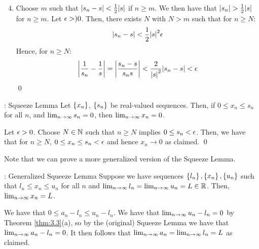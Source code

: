 \begin{nproofcont}
    \begin{enumerate}
        \setcounter{enumi}{3}
        \item Choose $m$ such that $\abs{s_n - s} < \frac{1}{2}\abs{s}$ if $n \geq m$. We then have that $\abs{s_n} > \frac{1}{2}\abs{s}$ for $n \geq m$. Let $\epsilon > )0$. Then, there exists $N$ with $N > m$ such that for $n \geq N$:
        \begin{align*}
            \abs{s_n - s} < \frac{1}{2}\abs{s}^2\epsilon
        \end{align*}
        Hence, for $n \geq N$:
        \begin{align*}
            \abs{\frac{1}{s_n} - \frac{1}{s}} = \abs{\frac{s_n - s}{s_ns}} < \frac{2}{\abs{s}^2}\abs{s_n - s} < \epsilon
        \end{align*}
        \qed
    \end{enumerate}
\end{nproofcont}

\begin{nlemma}{: Squeeze Lemma}{}
    Let $\set{x_n}$, $\set{s_n}$ be real-valued sequences. Then, if $0 \leq x_n \leq s_n$ for all $n$, and $\lim_{n \rightarrow \infty} s_n = 0$, then $\lim_{n \rightarrow \infty} x_n = 0$.
\end{nlemma}
\begin{nproof}
    Let $\epsilon > 0$. Choose $N \in \mathbb{N}$ such that $n \geq N$ implies $0 \leq s_n < \epsilon$. Then, we have that for $n \geq N$, $0 \leq x_n \leq s_n < \epsilon$ and hence $x_n \rightarrow 0$ as claimed. \qed
\end{nproof}

\noindent Note that we can prove a more generalized version of the Squeeze Lemma. 

\begin{nlemma}{: Generalized Squeeze Lemma}{}
    Suppose we have sequences $\set{l_n}, \set{x_n}, \set{u_n}$ such that $l_n \leq x_n \leq u_n$ for all $n$ and $\lim_{n \rightarrow \infty} l_n = \lim_{n \rightarrow \infty} u_n = L \in \mathbb{R}$. Then, $\lim_{n \rightarrow \infty} x_n = L$.
\end{nlemma}

\begin{nproof}
    We have that $0 \leq a_n - l_n \leq u_n - l_n$. We have that $\lim_{n \rightarrow \infty} u_n - l_n = 0$ by Theorem \ref{thm:3.3}(a), so by the (original) Squeeze Lemma we have that $\lim_{n \rightarrow \infty} a_n - l_n = 0$. It then follows that $\lim_{n \rightarrow \infty} a_n = \lim_{n \rightarrow \infty} l_n = L$ as claimed.
\end{nproof}

